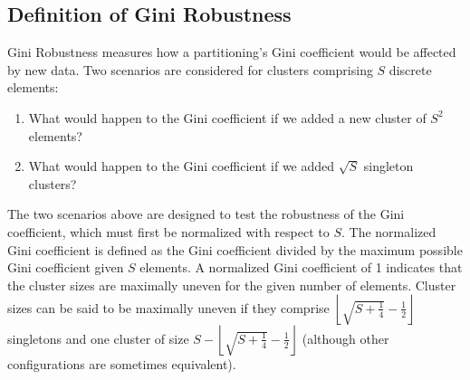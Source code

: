 \documentclass[8pt]{extarticle}
\begin{document}
%
%
%
%
%
%

    \subsection*{Definition of Gini Robustness}

    Gini Robustness measures how a partitioning's Gini coefficient would be affected by new data.
    Two scenarios are considered for clusters comprising $S$ discrete elements:

    \begin{enumerate}
        \item What would happen to the Gini coefficient if we added a new cluster of $S^2$ elements?
        \item What would happen to the Gini coefficient if we added $\sqrt{S} $ singleton clusters?
    \end{enumerate}

    The two scenarios above are designed to test the robustness of the Gini coefficient, which must first be normalized with respect to $S$.
    The normalized Gini coefficient is defined as the Gini coefficient divided by the maximum possible Gini coefficient given $S$ elements.
    A normalized Gini coefficient of 1 indicates that the cluster sizes are maximally uneven for the given number of elements.
    Cluster sizes can be said to be maximally uneven if they comprise $\left\lfloor\sqrt{S+\frac{1}{4}}-\frac{1}{2}\right\rfloor$ singletons and one cluster of size $S - \left\lfloor\sqrt{S+\frac{1}{4}}-\frac{1}{2}\right\rfloor$ (although other configurations are sometimes equivalent).
\end{document}

